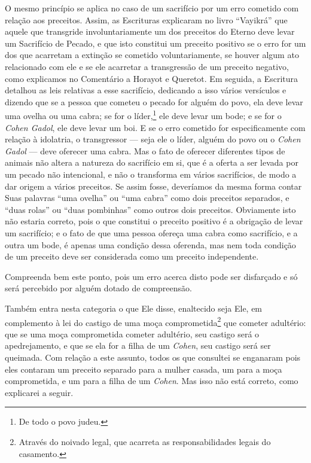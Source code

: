 O mesmo princípio se aplica no caso de um sacrifício por um erro
cometido com relação aos preceitos. Assim, as Escrituras explicaram no
livro ``Vayikrá'' que aquele que transgride involuntariamente um dos
preceitos do Eterno deve levar um Sacrifício de Pecado, e que isto
constitui um preceito positivo se o erro for um dos que acarretam a
extinção se cometido voluntariamente, se houver algum ato relacionado
com ele e se ele acarretar a transgressão de um preceito negativo, como
explicamos no Comentário a Horayot e Queretot. Em seguida, a Escritura
detalhou as leis relativas a esse sacrifício, dedicando a isso vários
versículos e dizendo que se a pessoa que cometeu o pecado for alguém do
povo, ela deve levar uma ovelha ou uma cabra; se for o
líder,\footnote{De todo o povo judeu.} ele deve levar um bode; e se for o \textit{Cohen
Gadol}, ele deve levar um boi. E se o erro cometido for especificamente
com relação à idolatria, o transgressor --- seja ele o líder, alguém do
povo ou o \textit{Cohen Gadol} --- deve oferecer uma cabra. Mas o fato de
oferecer diferentes tipos de animais não altera a natureza do sacrifício
em si, que é a oferta a ser levada por um pecado não intencional, e não
o transforma em vários sacrifícios, de modo a dar origem a vários
preceitos. Se assim fosse, deveríamos da mesma forma contar Suas
palavras ``uma ovelha'' ou ``uma cabra'' como dois preceitos separados,
e ``duas rolas'' ou ``duas pombinhas'' como outros dois preceitos.
Obviamente isto não estaria correto, pois o que constitui o preceito
positivo é a obrigação de levar um sacrifício; e o fato de que uma
pessoa ofereça uma cabra como sacrifício, e a outra um bode, é apenas
uma condição dessa oferenda, mas nem toda condição de um preceito deve
ser considerada como um preceito independente.

Compreenda bem este ponto, pois um erro acerca disto pode ser disfarçado
e só será percebido por alguém dotado de compreensão.

Também entra nesta categoria o que Ele disse, enaltecido seja Ele,
em complemento à lei do castigo de uma moça
comprometida\footnote{Através do noivado legal, que acarreta as responsabilidades legais
do casamento.} que cometer adultério: que se uma moça
comprometida cometer adultério, seu castigo será
o apedrejamento, e que se ela for a filha de um \textit{Cohen}, seu castigo
será ser
queimada. Com relação a este assunto, todos os que consultei se
enganaram pois eles contaram um preceito separado para a mulher casada,
um para a moça comprometida, e um para a filha de um \textit{Cohen}. Mas isso
não está correto, como explicarei a seguir.

